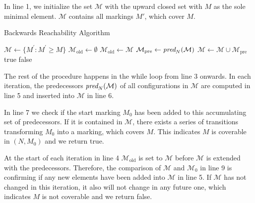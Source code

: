 In line 1, we initialize the set $\mathcal{M}$ with the upward closed set with $M$ as the sole minimal element. $\mathcal{M}$ contains all markings $M'$, which cover $M$. 

\begin{algorithm}[htb]
\caption{Backwards Reachability Algorithm}\label{alg:bw}
\begin{algorithmic}[1]
\State $\mathcal{M} \gets \{ M^{'} : M^{'} \ge M \}$
\State $\mathcal{M}_{\text{old}} \gets \emptyset$
	\State $\mathcal{M}_{\text{old}} \gets \mathcal{M}$
	\State $\mathcal{M}_{\text{pre}} \gets \operatorname{\textit{pred}}_{N}(\mathcal{M})$
	\State $\mathcal{M} \gets \mathcal{M}  \cup \mathcal{M}_{\text{pre}}$
	\Return true
\EndIf
{}
    \Return false
\EndIf
\EndWhile
\end{algorithmic}
\end{algorithm}

The rest of the procedure happens in the while loop from line 3 onwards. In each iteration, the predecessors $\operatorname{\textit{pred}}_{N}(\mathcal{M})$ of all configurations in $\mathcal{M}$ are computed in line 5 and inserted into $\mathcal{M}$ in line 6. 
\par
In line 7 we check if the start marking $M_{0}$ has been added to this accumulating set of predecessors. If it is contained in $\mathcal{M}$, there exists a series of transitions transforming $M_{0}$ into a marking, which covers $M$. This indicates $M$ is coverable in $(N,M_{0})$ and we return true. 
\par
At the start of each iteration in line 4 $\mathcal{M}_{\text{old}}$ is set to $\mathcal{M}$ before $\mathcal{M}$ is extended with the predecessors. Therefore, the comparison of $\mathcal{M}$ and $\mathcal{M}_{0}$ in line 9 is confirming if any new elements have been added into $\mathcal{M}$ in line 5. If $\mathcal{M}$ has not changed in this iteration, it also will not change in any future one, which indicates $M$ is not coverable and we return false.
\par




